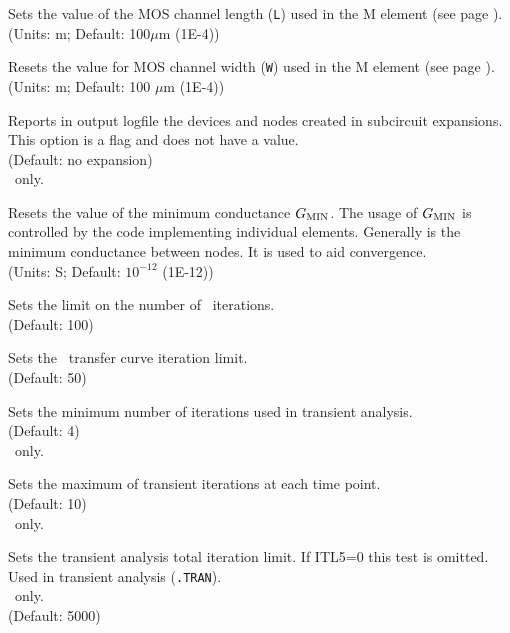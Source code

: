 \begin{widelist}
Sets the value of the MOS channel length ({\tt L})
used in the M element (see page \pageref{Melement}).
\\(Units: m; Default: 100$\mu$m (1E-4))

Resets the value for MOS channel width ({\tt W})
used in the M element (see page \pageref{Melement}).
\\(Units: m; Default: 100 $\mu$m (1E-4))

Reports in output logfile the devices and nodes created in subcircuit expansions.
This option is a flag and does not have a value.
\\(Default: no expansion)
{\\\pspice\ only.}


Resets the  value of the minimum conductance $G_{\mbox{\scriptsize MIN}}$. The usage of
$G_{\mbox{\scriptsize MIN}}$ is controlled by the code implementing individual
elements.   Generally is the minimum conductance between nodes.
It is used to aid convergence.
\\(Units: S; Default: $10^{-12}$ (1E-12))

Sets the limit on the number of \dc\ iterations.
\\(Default: 100)

Sets the \dc\  transfer curve iteration limit.
\\(Default: 50)

{
Sets the minimum number of iterations used in transient analysis.
\\(Default: 4)\\\spicetwo\ only.

Sets the maximum of transient iterations at each time point.
\\(Default: 10)\\\spicetwo\ only.
}

Sets the transient analysis  total  iteration  limit. If
ITL5=0 this test is omitted. Used in transient analysis ({\tt .TRAN}).
{\\\pspice\ only.}
\\(Default: 5000)


\end{widelist}
